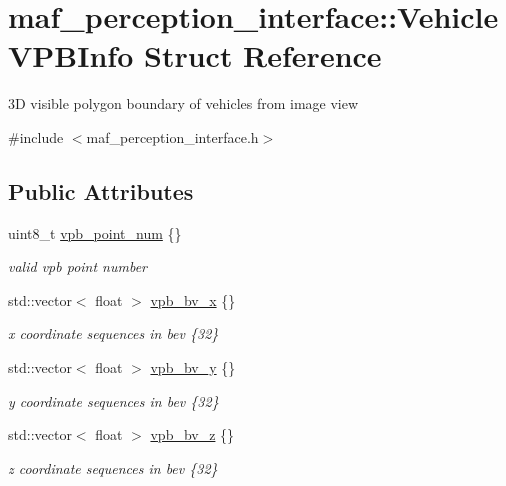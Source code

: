 \hypertarget{structmaf__perception__interface_1_1VehicleVPBInfo}{}\section{maf\+\_\+perception\+\_\+interface\+:\+:Vehicle\+V\+P\+B\+Info Struct Reference}
\label{structmaf__perception__interface_1_1VehicleVPBInfo}


3D visible polygon boundary of vehicles from image view  




{\ttfamily \#include $<$maf\+\_\+perception\+\_\+interface.\+h$>$}

\subsection*{Public Attributes}
\begin{DoxyCompactItemize}
\item 
uint8\+\_\+t \hyperlink{structmaf__perception__interface_1_1VehicleVPBInfo_af88dd563f8ec059734e24e6821b97338}{vpb\+\_\+point\+\_\+num} \{\}
\begin{DoxyCompactList}\small\item\em valid vpb point number \end{DoxyCompactList}\item 
std\+::vector$<$ float $>$ \hyperlink{structmaf__perception__interface_1_1VehicleVPBInfo_aa4d8c863316c49fea7be45f958ca9d12}{vpb\+\_\+bv\+\_\+x} \{\}
\begin{DoxyCompactList}\small\item\em x coordinate sequences in bev \{32\} \end{DoxyCompactList}\item 
std\+::vector$<$ float $>$ \hyperlink{structmaf__perception__interface_1_1VehicleVPBInfo_a8341de739f7024faeb8f361abf3be7b2}{vpb\+\_\+bv\+\_\+y} \{\}
\begin{DoxyCompactList}\small\item\em y coordinate sequences in bev \{32\} \end{DoxyCompactList}\item 
std\+::vector$<$ float $>$ \hyperlink{structmaf__perception__interface_1_1VehicleVPBInfo_a13386c1739c664b438f20fb75de46b06}{vpb\+\_\+bv\+\_\+z} \{\}
\begin{DoxyCompactList}\small\item\em z coordinate sequences in bev \{32\} \end{DoxyCompactList}\end{DoxyCompactItemize}


